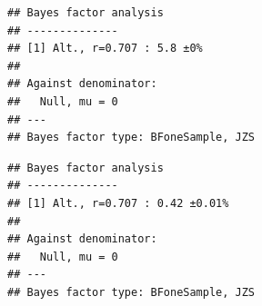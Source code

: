 \documentclass[
  doc,floatsintext]{apa6}
\newenvironment{Shaded}{\begin{snugshade}}{\end{snugshade}}
\newcommand{\AttributeTok}[1]{\textcolor[rgb]{0.13,0.29,0.53}{#1}}
\newcommand{\CommentTok}[1]{\textcolor[rgb]{0.56,0.35,0.01}{\textit{#1}}}
\newcommand{\DecValTok}[1]{\textcolor[rgb]{0.00,0.00,0.81}{#1}}
\newcommand{\FunctionTok}[1]{\textcolor[rgb]{0.13,0.29,0.53}{\textbf{#1}}}
\newcommand{\NormalTok}[1]{#1}
\newcommand{\OtherTok}[1]{\textcolor[rgb]{0.56,0.35,0.01}{#1}}
\newcommand{\SpecialCharTok}[1]{\textcolor[rgb]{0.81,0.36,0.00}{\textbf{#1}}}
\begin{document}
\begin{Shaded}
\end{Shaded}

\begin{Shaded}
\end{Shaded}

\begin{verbatim}
## Bayes factor analysis
## --------------
## [1] Alt., r=0.707 : 5.8 ±0%
## 
## Against denominator:
##   Null, mu = 0 
## ---
## Bayes factor type: BFoneSample, JZS
\end{verbatim}

\begin{Shaded}
\end{Shaded}

\begin{verbatim}
## Bayes factor analysis
## --------------
## [1] Alt., r=0.707 : 0.42 ±0.01%
## 
## Against denominator:
##   Null, mu = 0 
## ---
## Bayes factor type: BFoneSample, JZS
\end{verbatim}

\begin{Shaded}
\end{Shaded}
\end{document}
